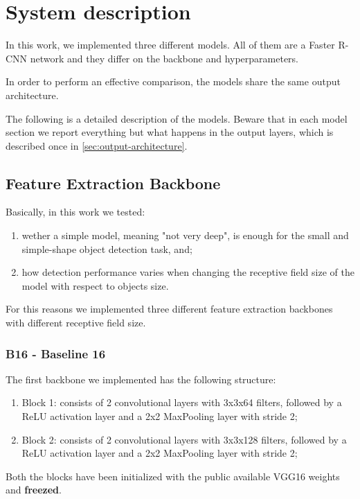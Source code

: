 \documentclass[a4paper,10pt]{report}
\begin{document}
\chapter{System description}\label{chap:system-description}

In this work, we implemented three different models. All of them are a Faster R-CNN network and they differ on the backbone and hyperparameters.

In order to perform an effective comparison, the models share the same output architecture.

The following is a detailed description of the models. Beware that in each model section we report everything but what happens in the output layers, which is described once in \ref{sec:output-architecture}.

\section{Feature Extraction Backbone}\label{sec:feature-extraction-backbone}
Basically, in this work we tested:
\begin{enumerate}
\item wether a simple model, meaning "not very deep", is enough for the small and simple-shape object detection task, and;
\item how detection performance varies when changing the receptive field size of the model with respect to objects size.
\end{enumerate}

For this reasons we implemented three different feature extraction backbones with different receptive field size.

\subsection{B16 - Baseline 16}\label{subsec:b16}

The first backbone we implemented has the following structure:
\begin{enumerate}
  \item Block 1: consists of 2 convolutional layers with 3x3x64 filters, followed by a ReLU activation layer and a 2x2 MaxPooling layer with stride 2;
  \item Block 2: consists of 2 convolutional layers with 3x3x128 filters, followed by a ReLU activation layer and a 2x2 MaxPooling layer with stride 2;
\end{enumerate}
Both the blocks have been initialized with the public available VGG16 weights and \textbf{freezed}.
\end{document}
